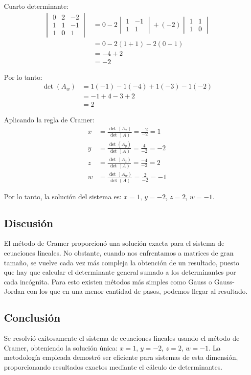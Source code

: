 \documentclass{article}
\begin{document}
Cuarto determinante:
\begin{align}
    \begin{vmatrix} 0 & 2 & -2 \\ 1 & 1 & -1 \\ 1 & 0 & 1 \end{vmatrix} &= 0 - 2 \begin{vmatrix} 1 & -1 \\ 1 & 1 \end{vmatrix} + (-2) \begin{vmatrix} 1 & 1 \\ 1 & 0 \end{vmatrix} \\
    &= 0 - 2(1 + 1) - 2(0 - 1) \\
    &= -4 + 2 \\
    &= -2
\end{align}

Por lo tanto:
\begin{align}
    \det(A_w) &= 1(-1) - 1(-4) + 1(-3) - 1(-2) \\
    &= -1 + 4 - 3 + 2 \\
    &= 2
\end{align}

Aplicando la regla de Cramer:
\begin{align}
x &= \frac{\det(A_x)}{\det(A)} = \frac{-2}{-2} = 1 \\
y &= \frac{\det(A_y)}{\det(A)} = \frac{4}{-2} = -2 \\
z &= \frac{\det(A_z)}{\det(A)} = \frac{-4}{-2} = 2 \\
w &= \frac{\det(A_w)}{\det(A)} = \frac{2}{-2} = -1
\end{align}

Por lo tanto, la solución del sistema es: $x = 1$, $y = -2$, $z = 2$, $w = -1$.


\subsection{Discusión}
El método de Cramer proporcionó una solución exacta para el sistema de ecuaciones lineales. No obstante, cuando nos enfrentamos a matrices de gran tamaño, se vuelve cada vez más compleja la obtención de un resultado, puesto que hay que calcular el determinante general sumado a los determinantes por cada incógnita. Para esto existen métodos más simples como Gauss o Gauss-Jordan con los que en una menor cantidad de pasos, podemos llegar al resultado.

\subsection{Conclusión}
Se resolvió exitosamente el sistema de ecuaciones lineales usando el método de Cramer, obteniendo la solución única: $x = 1$, $y = -2$, $z = 2$, $w = -1$. La metodología empleada demostró ser eficiente para sistemas de esta dimensión, proporcionando resultados exactos mediante el cálculo de determinantes.
\end{document}
